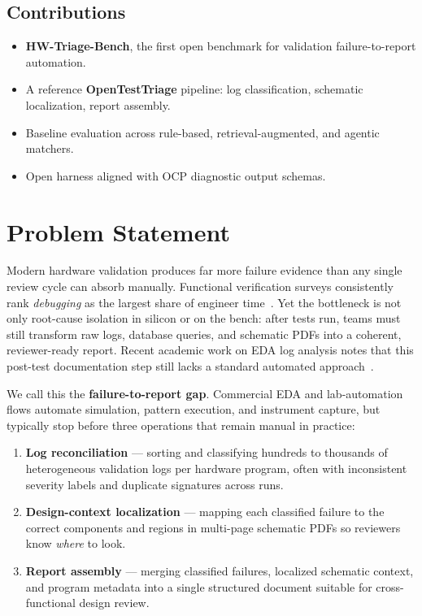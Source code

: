 \documentclass[conference]{IEEEtran}
\begin{document}
\subsection{Contributions}
\begin{itemize}
    \item \textbf{HW-Triage-Bench}, the first open benchmark for validation failure-to-report automation.
    \item A reference \textbf{OpenTestTriage} pipeline: log classification, schematic localization, report assembly.
    \item Baseline evaluation across rule-based, retrieval-augmented, and agentic matchers.
    \item Open harness aligned with OCP diagnostic output schemas.
\end{itemize}

\section{Problem Statement}
\label{sec:problem}

Modern hardware validation produces far more failure evidence than any single review cycle can absorb manually.
Functional verification surveys consistently rank \emph{debugging} as the largest share of engineer time~\cite{wilson2024verification}.
Yet the bottleneck is not only root-cause isolation in silicon or on the bench: after tests run, teams must still transform raw logs, database queries, and schematic PDFs into a coherent, reviewer-ready report.
Recent academic work on EDA log analysis notes that this post-test documentation step still lacks a standard automated approach~\cite{kanagal2025eda}.

We call this the \textbf{failure-to-report gap}.
Commercial EDA and lab-automation flows automate simulation, pattern execution, and instrument capture, but typically stop before three operations that remain manual in practice:
\begin{enumerate}
    \item \textbf{Log reconciliation} --- sorting and classifying hundreds to thousands of heterogeneous validation logs per hardware program, often with inconsistent severity labels and duplicate signatures across runs.
    \item \textbf{Design-context localization} --- mapping each classified failure to the correct components and regions in multi-page schematic PDFs so reviewers know \emph{where} to look.
    \item \textbf{Report assembly} --- merging classified failures, localized schematic context, and program metadata into a single structured document suitable for cross-functional design review.
\end{enumerate}
\end{document}
